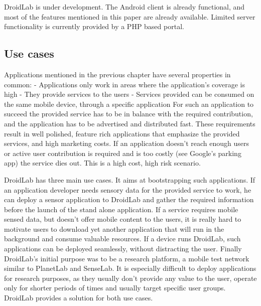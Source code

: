\documentclass[conference,letterpaper]{IEEEtran}
\begin{document}
DroidLab is under development. The Android client is already functional, and most of the features mentioned in this paper are already available. Limited server functionality is currently provided by a PHP based portal.

\subsection{Use cases}
\label{sec:use_cases}
Applications mentioned in the previous chapter have several properties in common:
- Applications only work in areas where the application's coverage is high
- They provide services to the users
- Services provided can be consumed on the same mobile device, through a specific application
For such an application to succeed the provided service has to be in balance with the required contribution, and the application has to be advertised and distributed fast. These requirements result in well polished, feature rich applications that emphasize the provided services, and high marketing costs. If an application doesn't reach enough users or active user contribution is required and is too costly (see Google's parking app) the service dies out. This is a high cost, high risk scenario.

DroidLab has three main use cases. It aims at bootstrapping such applications. If an application developer needs sensory data for the provided service to work, he can deploy a sensor application to DroidLab and gather the required information before the launch of the stand alone application. If a service requires mobile sensed data, but doesn't offer mobile content to the users, it is really hard to motivate users to download yet another application that will run in the background and consume valuable resources. If a device runs DroidLab, such applications can be deployed seamlessly, without distracting the user. Finally DroidLab's initial purpose was to be a research platform, a mobile test network similar to PlanetLab and SenseLab. It is especially difficult to deploy applications for research purposes, as they usually don't provide any value to the user, operate only for shorter periods of times and usually target specific user groups. DroidLab provides a solution for both use cases.
\end{document}
